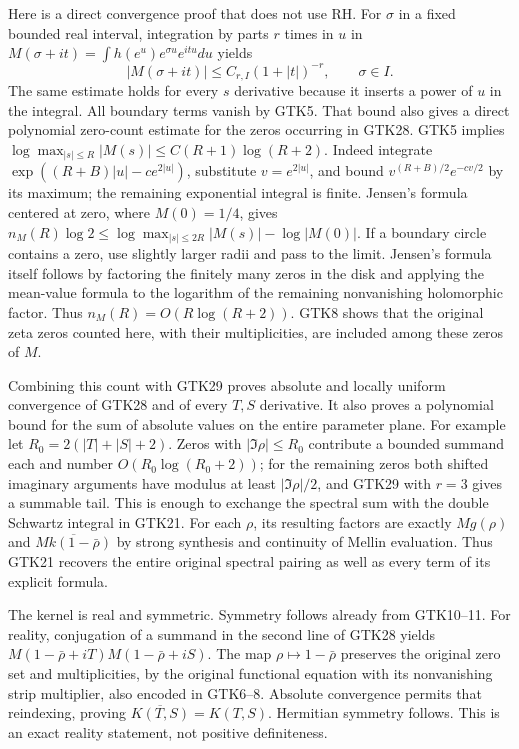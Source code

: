 Here is a direct convergence proof that does not use RH.
For $\sigma$ in a fixed bounded real interval, integration
by parts $r$ times in $u$ in
$M(\sigma+it)=\int h(e^u)e^{\sigma u}e^{itu}du$ yields
\begin{equation}\tag{GTK29}
 |M(\sigma+it)|\le C_{r,I}(1+|t|)^{-r},
                 \qquad \sigma\in I .
\end{equation}
The same estimate holds for every $s$ derivative because
it inserts a power of $u$ in the integral. All boundary
terms vanish by GTK5.
That bound also gives a direct polynomial zero-count
estimate for the zeros occurring in GTK28. GTK5 implies
$\log\max_{|s|\le R}|M(s)|\le C(R+1)\log(R+2)$.
Indeed integrate
$\exp((R+B)|u|-c e^{2|u|})$, substitute $v=e^{2|u|}$,
and bound $v^{(R+B)/2}e^{-cv/2}$ by its maximum;
the remaining exponential integral is finite. Jensen's
formula centered at zero, where $M(0)=1/4$, gives
$n_M(R)\log2\le\log\max_{|s|\le2R}|M(s)|-\log|M(0)|$.
If a boundary circle contains a zero, use slightly
larger radii and pass to the limit. Jensen's formula
itself follows by factoring the finitely many zeros in
the disk and applying the mean-value formula to the
logarithm of the remaining nonvanishing holomorphic
factor. Thus $n_M(R)=O(R\log(R+2))$. GTK8 shows that
the original zeta zeros counted here, with their
multiplicities, are included among these zeros of $M$.

Combining this count with GTK29 proves absolute and
locally uniform convergence of GTK28 and of every
$T,S$ derivative. It also proves a polynomial bound
for the sum of absolute values on the entire parameter
plane. For example let $R_0=2(|T|+|S|+2)$. Zeros with
$|\Im\rho|\le R_0$ contribute a bounded summand each
and number $O(R_0\log(R_0+2))$; for the remaining zeros
both shifted imaginary arguments have modulus at least
$|\Im\rho|/2$, and GTK29 with $r=3$ gives a summable
tail. This is enough to exchange the spectral sum
with the double Schwartz integral in GTK21.
For each $\rho$, its resulting factors are exactly
$Mg(\rho)$ and $\overline{Mk(1-\bar\rho)}$ by strong
synthesis and continuity of Mellin evaluation.
Thus GTK21 recovers the entire original spectral
pairing as well as every term of its explicit formula.

The kernel is real and symmetric. Symmetry follows
already from GTK10--11. For reality, conjugation of a
summand in the second line of GTK28 yields
$M(1-\bar\rho+iT)M(1-\bar\rho+iS)$.
The map $\rho\mapsto1-\bar\rho$ preserves the original
zero set and multiplicities, by the original functional
equation with its nonvanishing strip multiplier, also
encoded in GTK6--8. Absolute convergence permits that
reindexing, proving $\overline{K(T,S)}=K(T,S)$.
Hermitian symmetry follows. This is an exact reality
statement, not positive definiteness.

